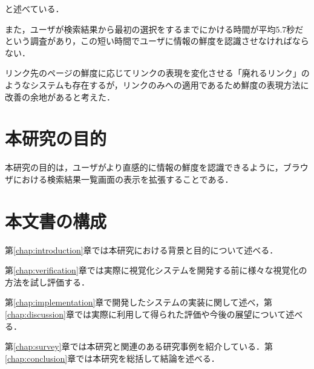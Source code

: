と述べている．

また，ユーザが検索結果から最初の選択をするまでにかける時間が平均5.7秒だという調査\cite{pinball}があり，この短い時間でユーザに情報の鮮度を認識させなければならない．

リンク先のページの鮮度に応じてリンクの表現を変化させる「廃れるリンク」\cite{dyinglink}のようなシステムも存在するが，リンクのみへの適用であるため鮮度の表現方法に改善の余地があると考えた．

\section{本研究の目的}

本研究の目的は，ユーザがより直感的に情報の鮮度を認識できるように，ブラウザにおける検索結果一覧画面の表示を拡張することである．

\section{本文書の構成}

第\ref{chap:introduction}章では本研究における背景と目的について述べる．

第\ref{chap:verification}章では実際に視覚化システムを開発する前に様々な視覚化の方法を試し評価する．

第\ref{chap:implementation}章で開発したシステムの実装に関して述べ，第\ref{chap:discussion}章では実際に利用して得られた評価や今後の展望について述べる．

第\ref{chap:survey}章では本研究と関連のある研究事例を紹介している．第\ref{chap:conclusion}章では本研究を総括して結論を述べる．
